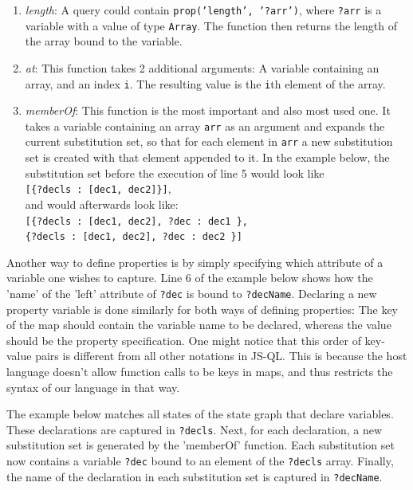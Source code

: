 \begin{enumerate}
\item \textit{length}: A query could contain \texttt{prop('length', '?arr')}, where \texttt{?arr} is a variable with a value of type \texttt{Array}. The function then returns the length of the array bound to the variable.
\item \textit{at}: This function takes 2 additional arguments: A variable containing an array, and an index \texttt{i}. The resulting value is the \texttt{i}th element of the array.
\item \textit{memberOf}: This function is the most important and also most used one. It takes a variable containing an array \texttt{arr} as an argument and expands the current substitution set, so that for each element in \texttt{arr} a new substitution set is created with that element appended to it. In the example below, the substitution set before the execution of line 5 would look like \\\texttt{[\{?decls : [dec1, dec2]\}]}, \\and would afterwards look like: \\\texttt{[\{?decls : [dec1, dec2], ?dec : dec1 \},\\\phantom{ }\{?decls : [dec1, dec2], ?dec : dec2 \}]}
\end{enumerate}

\noindent Another way to define properties is by simply specifying which attribute of a variable one wishes to capture. Line 6 of the example below shows how the 'name' of the 'left' attribute of \texttt{?dec} is bound to \texttt{?decName}. Declaring a new property variable is done similarly for both ways of defining properties: The key of the map should contain the variable name to be declared, whereas the value should be the property specification. One might notice that this order of key-value pairs is different from all other notations in JS-QL. This is because the host language doesn't allow function calls to be keys in maps, and thus restricts the syntax of our language in that way.

The example below matches all states of the state graph that declare variables. These declarations are captured in \texttt{?decls}. Next, for each declaration, a new substitution set is generated by the 'memberOf' function. Each substitution set now contains a variable \texttt{?dec} bound to an element of the \texttt{?decls} array. Finally, the name of the declaration in each substitution set is captured in \texttt{?decName}.

